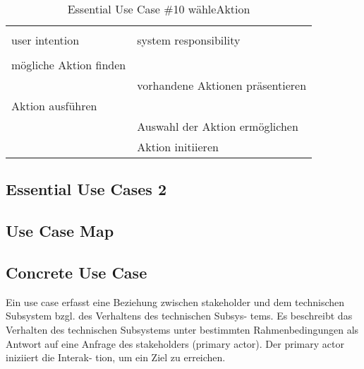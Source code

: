 \begin{table}[H]
\caption{Essential Use Case \#10 wähleAktion }
\centering
\begin{tabular}{l l}
\\ [-0.5ex]

\hline\hline
\\ [-0.5ex]
user intention & system responsibility
\\ [1.5ex]
\hline
\\ [-0.5ex]
mögliche Aktion finden        &                                \\[1ex]
                        & vorhandene Aktionen präsentieren        \\[1ex]
Aktion ausführen           &                                \\[1ex] 
                        & Auswahl der Aktion ermöglichen       \\[1ex]
                        & Aktion initiieren                    \\[1ex]
\hline
\end{tabular}
\label{tab:aktionen}
\end{table}


\newpage
\subsection{Essential Use Cases 2}

\newpage
\subsection{Use Case Map}

\newpage
\subsection{Concrete Use Case}
Ein use case erfasst eine Beziehung zwischen stakeholder und dem technischen Subsystem bzgl. des Verhaltens des technischen Subsys- tems. Es beschreibt das Verhalten des technischen Subsystems unter bestimmten Rahmenbedingungen als Antwort auf eine Anfrage des stakeholders (primary actor). Der primary actor iniziiert die Interak- tion, um ein Ziel zu erreichen.

